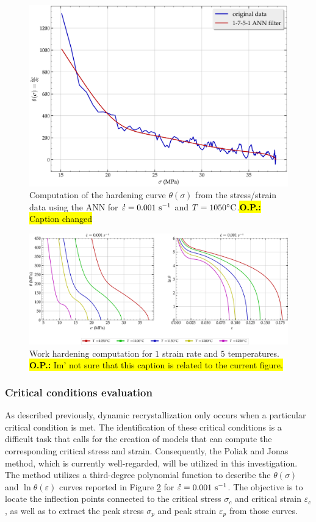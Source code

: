 \documentclass[metals,article,submit,pdftex,moreauthors]{Definitions/mdpi}
\DeclareRobustCommand{\mdot}[1]{\accentset{\mbox{\bfseries .}}{#1}}
\DeclareRobustCommand{\ps}{\text{s}^{-1}}
\DeclareRobustCommand{\OP}[1]{\begingroup\sethlcolor{VWyellow}\textcolor{red}{\hl{\textbf{O.P.:} #1}}\endgroup}
\begin{document}
\begin{figure}[H]
\centering
\includegraphics[width=0.7\columnwidth]{Figures/AnnTheta}
\caption{Computation of the hardening curve $\theta(\sigma)$ from the stress/strain data using the ANN for $\mdot\varepsilon=0.001~\ps$ and $T=1050\celsius$.\OP{Caption changed}}
\label{fig:AnnTheta}
\end{figure}

\begin{figure}[H]
\centering
\includegraphics[width=0.99\columnwidth]{Figures/nThetaOP}
\caption{Work hardening computation for $1$ strain rate and $5$ temperatures. \OP{Im' not sure that this caption is related to the current figure.}}
\label{fig:nThetaOP}
\end{figure}

\subsubsection{Critical conditions evaluation\label{subsec:CrConditions}}

As described previously, dynamic recrystallization only occurs when a particular critical condition is met.
The identification of these critical conditions is a difficult task that calls for the creation of models that can compute the corresponding critical stress and strain.
Consequently, the Poliak and Jonas \cite{Poliak-1996,ei2003initiation,ei2003critical,jonas2003critical} method, which is currently well-regarded, will be utilized in this investigation.
The method utilizes a third-degree polynomial function to describe the $\theta(\sigma)$ and $\ln \theta(\varepsilon)$ curves reported in Figure \ref{fig:nThetaOP} for $\mdot\varepsilon=0.001~\ps$.
The objective is to locate the inflection points connected to the critical stress $\sigma_c$ and critical strain $\varepsilon_c$, as well as to extract the peak stress $\sigma_p$ and peak strain $\varepsilon_p$ from those curves.
\end{document}
